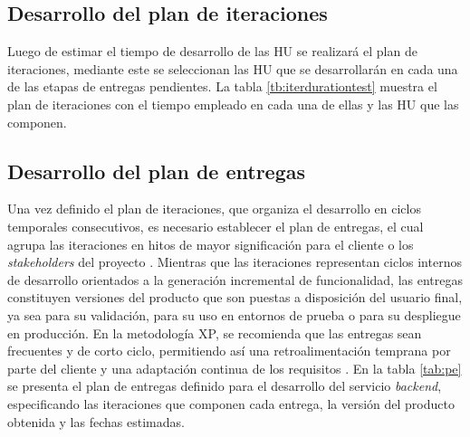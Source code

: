 \subsection{Desarrollo del plan de iteraciones}

Luego de estimar el tiempo de desarrollo de las \ac{HU} se realizará el plan de iteraciones, mediante este se
seleccionan las \ac{HU} que se desarrollarán en cada una de las etapas de entregas pendientes. La tabla 
\ref{tb:iterdurationtest} muestra el plan de iteraciones con el tiempo empleado en cada una 
de ellas y las \ac{HU} que las componen.

\begin{iterationplan}[tb:iterdurationtest]
\end{iterationplan}


\subsection{Desarrollo del plan de entregas}

Una vez definido el plan de iteraciones, que organiza el desarrollo en ciclos 
temporales consecutivos, es necesario establecer el plan de entregas, 
el cual agrupa las iteraciones en hitos de mayor significación para el cliente o los 
\textit{stakeholders} del proyecto \citep{beck2004extreme}. Mientras que las iteraciones 
representan ciclos internos de desarrollo orientados a la generación incremental de funcionalidad, 
las entregas constituyen versiones del producto que son puestas a disposición del usuario final, ya 
sea para su validación, para su uso en entornos de prueba o para su despliegue en producción. En 
la metodología \ac{XP}, se recomienda que las entregas sean frecuentes y de corto ciclo, 
permitiendo así una retroalimentación temprana por parte del cliente y una adaptación continua 
de los requisitos \citep{wells2009extreme}. En la tabla \ref{tab:pe} se presenta el plan de entregas definido 
para el desarrollo del servicio \textit{backend}, especificando las iteraciones que componen cada entrega, la versión
del producto obtenida y las fechas estimadas.

